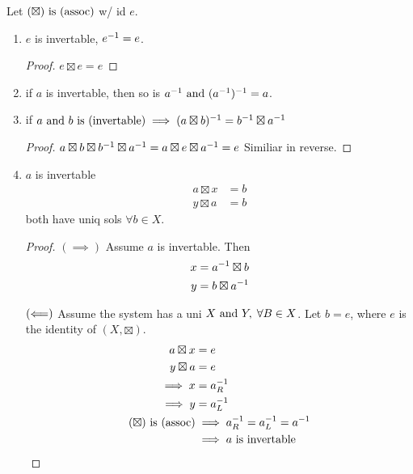 \documentclass[12pt]{article}
\newcommand{\gop}[0]{\boxtimes}
\begin{document}
\bbox
\begin{lem}\label{lem:prop_of_inv}
  Let \((\gop)\is\TM{assoc}\) w/ id \(e\). 
  \begin{enumerate}
    \item \(e\) is invertable, \(e^{-1}=e\). \bboxproof\begin{proof} \(e\gop e=e\)\end{proof}\ebox
    \item if \(a\) is invertable, then so is \(a^{-1}\text{ and } (a^{-1})^{-1}=a\).
    \item if \(a\nd b\is\TM{invertable}\implies\inv{(a\gop b)}=\inv b\gop\inv a\)
      \bboxproof
      \begin{proof}\(a\gop b\gop\inv b\gop\inv a=a\gop e\gop\inv a=e\) 
        Similiar in reverse.
      \end{proof}
      \ebox
    \item \(a\) is invertable 
      \begin{equation*}
        \begin{split}
          a\gop x&=b\\
          y\gop a&=b
        \end{split}
      \end{equation*} both have uniq sols \(\forall b\in X\).
      \bboxproof
      \begin{proof}
        \((\implies)\) Assume \(a\) is invertable. Then
        \begin{equation*}
          \begin{split}
            x&=\inv a\gop b\\
            y&=b\gop\inv a
          \end{split}
        \end{equation*}

        \((\Longleftarrow)\) Assume the system has a uni \(X\text{ and } Y,\;\forall B\in X\).
        Let \(b=e\), where \(e\) is the identity of \((X,\gop)\).
        \begin{equation*}
          \begin{split}
            a\gop x&=e\\
            y\gop a&=e\\
            \implies x&=\inv a_R\\
            \implies y&=\inv a_L\\
            (\gop)\is\TM{assoc}&\implies \inv a_R=\inv a_L=\inv a\\
                               &\implies a\T{ is invertable}
          \end{split}
        \end{equation*}
      \end{proof}
      \ebox
  \end{enumerate}
\end{lem}
\ebox
\end{document}
